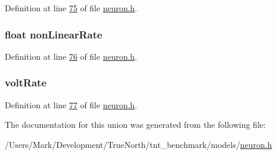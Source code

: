 Definition at line \hyperlink{neuron_8h_source_l00075}{75} of file \hyperlink{neuron_8h_source}{neuron.\+h}.

\hypertarget{unionreset_rate_a54aaba14ce85fd9c5d7b385d98727e36}{}
\subsubsection[{non\+Linear\+Rate}]{\setlength{\rightskip}{0pt plus 5cm}float non\+Linear\+Rate}\label{unionreset_rate_a54aaba14ce85fd9c5d7b385d98727e36}


Definition at line \hyperlink{neuron_8h_source_l00076}{76} of file \hyperlink{neuron_8h_source}{neuron.\+h}.

\hypertarget{unionreset_rate_a5a9af6c017d8b70e4db9283f2f7e726b}{}
\subsubsection[{volt\+Rate}]{ volt\+Rate}\label{unionreset_rate_a5a9af6c017d8b70e4db9283f2f7e726b}


Definition at line \hyperlink{neuron_8h_source_l00077}{77} of file \hyperlink{neuron_8h_source}{neuron.\+h}.



The documentation for this union was generated from the following file\+:\begin{DoxyCompactItemize}
\item 
/\+Users/\+Mark/\+Development/\+True\+North/tnt\+\_\+benchmark/models/\hyperlink{neuron_8h}{neuron.\+h}\end{DoxyCompactItemize}

